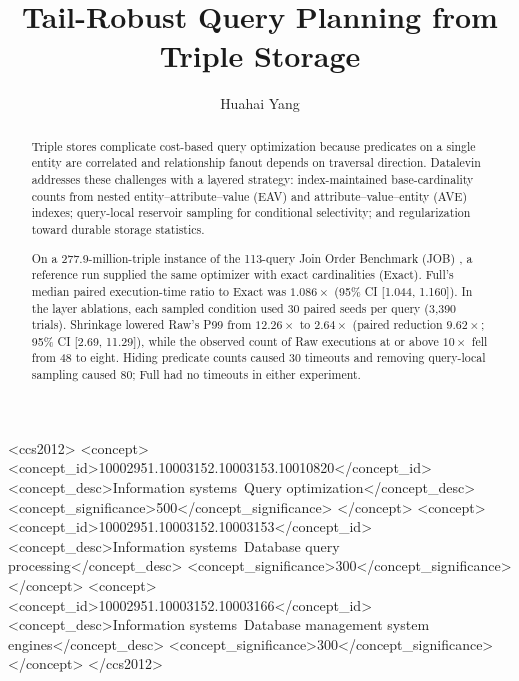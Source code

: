 \documentclass[sigconf]{cidr-2027}
\title{Tail-Robust Query Planning from Triple Storage}
\author{Huahai Yang}
\affiliation{%
  \institution{Juji, Inc.}
  \city{San Jose, CA}
  \country{USA}}
\begin{document}
\begin{abstract}
Triple stores complicate cost-based query optimization because predicates on a
single entity are correlated and relationship fanout depends on traversal
direction. Datalevin \cite{datalevin} addresses these challenges with a
layered strategy: index-maintained base-cardinality counts from nested
entity--attribute--value (EAV) and attribute--value--entity (AVE) indexes;
query-local reservoir sampling for conditional selectivity; and
regularization toward durable storage statistics.

On a 277.9-million-triple instance of the 113-query Join Order Benchmark
(JOB) \cite{leis2015optimizers}, a reference run supplied the same optimizer
with exact cardinalities (Exact). Full's median paired execution-time ratio
to Exact was $1.086\times$ (95\% CI [1.044, 1.160]). In the layer ablations,
each sampled condition used 30 paired seeds per query (3,390 trials). Shrinkage
lowered Raw's P99 from $12.26\times$ to $2.64\times$
(paired reduction $9.62\times$; 95\% CI [2.69, 11.29]), while the observed
count of Raw executions at or above $10\times$ fell from 48 to eight.
Hiding predicate counts caused 30 timeouts and removing query-local sampling
caused 80; Full had no timeouts in either experiment.
\end{abstract}

\begin{CCSXML}
<ccs2012>
 <concept>
  <concept_id>10002951.10003152.10003153.10010820</concept_id>
  <concept_desc>Information systems~Query optimization</concept_desc>
  <concept_significance>500</concept_significance>
 </concept>
 <concept>
  <concept_id>10002951.10003152.10003153</concept_id>
  <concept_desc>Information systems~Database query processing</concept_desc>
  <concept_significance>300</concept_significance>
 </concept>
 <concept>
  <concept_id>10002951.10003152.10003166</concept_id>
  <concept_desc>Information systems~Database management system engines</concept_desc>
  <concept_significance>300</concept_significance>
 </concept>
</ccs2012>
\end{CCSXML}



\maketitle
\end{document}
